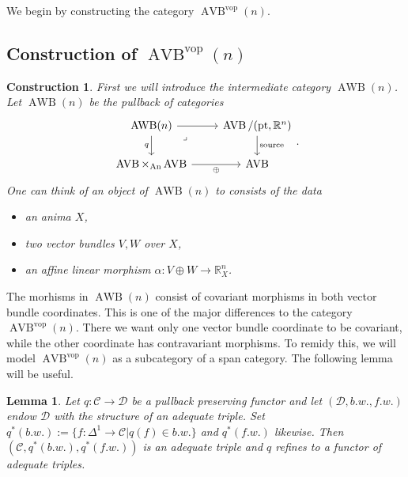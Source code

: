 \documentclass{article}
\newcommand{\R}{\mathbb{R}} %
\newcommand{\cC}{\mathcal{C}}
\newcommand{\cD}{\mathcal{D}}
\newcommand{\pt}{\mathrm{pt}}
\newcommand{\vop}{\mathrm{vop}}
\DeclareMathOperator{\AVB}{AVB}
\DeclareMathOperator{\AWB}{AWB}
\DeclareMathOperator{\An}{An}
\newtheorem{lemma}{Lemma}
\newtheorem{construction}{Construction}
\begin{document}
We begin by constructing the category $\AVB^\vop(n)$.

\subsection{Construction of $\AVB^\vop(n)$}

\begin{construction}
    First we will introduce the intermediate category $\AWB(n)$.
    Let $\AWB(n)$ be the pullback of categories 
    \[\begin{tikzcd}
        {\AWB(n)} & {\AVB/(\pt,\R^n)} \\
        {\AVB \times_{\An} \AVB} & \AVB
        \arrow["\oplus"', from=2-1, to=2-2]
        \arrow["{\mathrm{source}}", from=1-2, to=2-2]
        \arrow["q"', from=1-1, to=2-1]
        \arrow[from=1-1, to=1-2]
        \arrow["\lrcorner"{anchor=center, pos=0.125}, draw=none, from=1-1, to=2-2]
    \end{tikzcd}.\]
    One can think of an object of $\AWB(n)$ to consists of the data 
    \begin{itemize}
        \item an anima $X$,
        \item two vector bundles $V,W$ over $X$,
        \item an affine linear morphism $\alpha \colon V\oplus W \to \R^n_X$.
    \end{itemize}
\end{construction}
The morhisms in $\AWB(n)$ consist of covariant morphisms in both vector bundle
coordinates. This is one of the major differences to the category $\AVB^\vop(n)$.
There we want only one vector bundle coordinate to be covariant, while the other coordinate 
has contravariant morphisms. To remidy this, we will model $\AVB^\vop(n)$ as a subcategory of 
a span category. The following lemma will be useful. 
\begin{lemma}
Let $q \colon \cC \to \cD$ be a pullback preserving functor and let 
$(\cD, b.w., f.w.)$ endow $\cD$ with the structure of an adequate triple. 
Set $q^*(b.w.) := \{ f \colon \Delta^1 \to \cC | q(f) \in b.w.\}$
and $q^*(f.w.)$ likewise.
Then $(\cC, q^*(b.w.), q^*(f.w.))$ is an adequate triple and $q$ refines 
to a functor of adequate triples. 
\end{lemma}
\end{document}
